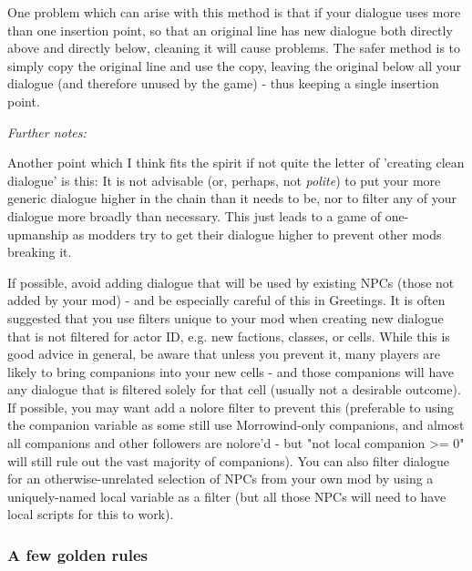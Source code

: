 One problem which can arise with this method is that if your dialogue
uses more than one insertion point, so that an original line has new
dialogue both directly above and directly below, cleaning it will cause
problems. The safer method is to simply copy the original line and use
the copy, leaving the original below all your dialogue (and therefore
unused by the game) - thus keeping a single insertion point.

\emph{Further notes:}

Another point which I think fits the spirit if not quite the letter of
'creating clean dialogue' is this: It is not advisable (or, perhaps, not
\emph{polite}) to put your more generic dialogue higher in the chain
than it needs to be, nor to filter any of your dialogue more broadly
than necessary. This just leads to a game of one-upmanship as modders
try to get their dialogue higher to prevent other mods breaking it.

If possible, avoid adding dialogue that will be used by existing NPCs
(those not added by your mod) - and be especially careful of this in
Greetings. It is often suggested that you use filters unique to your mod
when creating new dialogue that is not filtered for actor ID, e.g. new
factions, classes, or cells. While this is good advice in general, be
aware that unless you prevent it, many players are likely to bring
companions into your new cells - and those companions will have any
dialogue that is filtered solely for that cell (usually not a desirable
outcome). If possible, you may want add a nolore filter to prevent this
(preferable to using the companion variable as some still use
Morrowind-only companions, and almost all companions and other followers
are nolore'd - but "not local companion \textgreater= 0" will still rule
out the vast majority of companions). You can also filter dialogue for
an otherwise-unrelated selection of NPCs from your own mod by using a
uniquely-named local variable as a filter (but all those NPCs will need
to have local scripts for this to work).

\hypertarget{a-few-golden-rules}{%
\subsubsection{A few golden rules}\label{a-few-golden-rules}}

